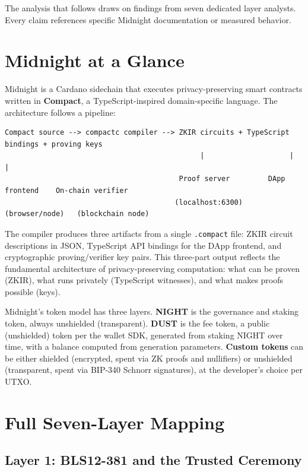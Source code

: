 \documentclass[
  11pt,
  openany]{report}
\renewcommand{\textbf}[1]{{\bfseries\color{MidnightBold}#1}}
\begin{document}
The analysis that follows draws on findings from seven dedicated layer analysts.
Every claim references specific Midnight documentation or measured behavior.

\section{Midnight at a Glance}\label{midnight-at-a-glance}

Midnight is a Cardano sidechain that executes privacy-preserving smart contracts
written in \textbf{Compact}, a TypeScript-inspired domain-specific language. The
architecture follows a pipeline:

\begin{verbatim}
Compact source --> compactc compiler --> ZKIR circuits + TypeScript bindings + proving keys
                                              |                    |                |
                                         Proof server         DApp frontend    On-chain verifier
                                        (localhost:6300)      (browser/node)   (blockchain node)
\end{verbatim}

The compiler produces three artifacts from a single \texttt{.compact} file: ZKIR
circuit descriptions in JSON, TypeScript API bindings for the DApp frontend, and
cryptographic proving/verifier key pairs. This three-part output reflects the
fundamental architecture of privacy-preserving computation: what can be proven
(ZKIR), what runs privately (TypeScript witnesses), and what makes proofs
possible (keys).

Midnight's token model has three layers. \textbf{NIGHT} is the governance and
staking token, always unshielded (transparent). \textbf{DUST} is the fee token,
a public (unshielded) token per the wallet SDK, generated from staking NIGHT
over time, with a balance computed from generation parameters. \textbf{Custom
tokens} can be either shielded (encrypted, spent via ZK proofs and nullifiers)
or unshielded (transparent, spent via BIP-340 Schnorr signatures), at the
developer's choice per UTXO.

\section{Full Seven-Layer Mapping}\label{full-seven-layer-mapping}

\subsection{Layer 1: BLS12-381 and the Trusted
Ceremony}\label{layer-1-bls12-381-and-the-trusted-ceremony}
\end{document}
